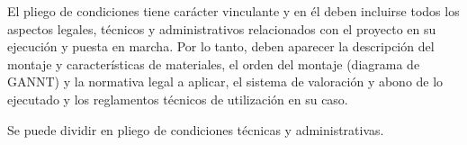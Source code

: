 \clearpage
{}
El pliego de condiciones tiene carácter vinculante y en él deben incluirse todos los aspectos
legales, técnicos y administrativos relacionados con el proyecto en su ejecución y puesta en
marcha. Por lo tanto, deben aparecer la descripción del montaje y características de materiales,
el orden del montaje (diagrama de GANNT) y la normativa legal a aplicar, el sistema de valoración
y abono de lo ejecutado y los reglamentos técnicos de utilización en su caso.


Se puede dividir en pliego de condiciones técnicas y administrativas.


